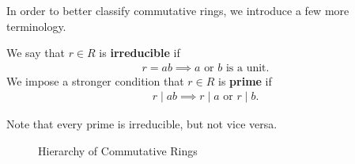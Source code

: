 \documentclass{memoir}
\begin{document}
In order to better classify commutative rings, we introduce a few more terminology.

\begin{defn}
	We say that \(r \in R\) is \textbf{irreducible} if 
	\begin{align*}
		r = ab \implies a \text{ or }b \text{ is a unit}.
	\end{align*}
	We impose a stronger condition that \(r \in R\) is \textbf{prime} if 
	\begin{align*}
		r \mid ab \implies r\mid a \text{ or }r \mid b.
	\end{align*}

\end{defn}
Note that every prime is irreducible, but not vice versa.\\

\begin{figure}[ht]
    \centering
     \def\svgwidth{1\linewidth}
     
    \caption{Hierarchy of Commutative Rings}
    \label{fig:hierarchy-of-commutative-rings}
\end{figure}
\end{document}
